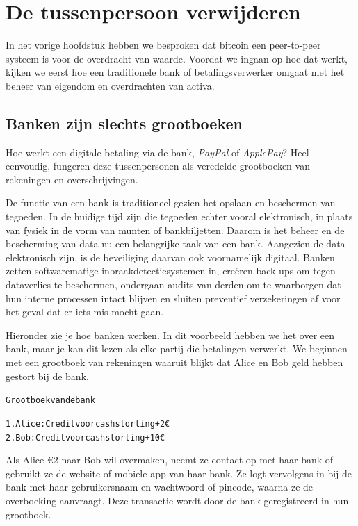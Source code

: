 \hypertarget{chap2}{%
\chapter{De tussenpersoon verwijderen}\label{chap2}}

In het vorige hoofdstuk hebben we besproken dat bitcoin een peer-to-peer systeem is voor de overdracht van waarde. Voordat we ingaan op hoe dat werkt, kijken we eerst hoe een traditionele bank of betalingsverwerker omgaat met het beheer van eigendom en overdrachten van activa.

\section{Banken zijn slechts grootboeken}

Hoe werkt een digitale betaling via de bank, \textit{PayPal} of \textit{ApplePay}? Heel eenvoudig, fungeren deze tussenpersonen als veredelde grootboeken van rekeningen en overschrijvingen.

De functie van een bank is traditioneel gezien het opslaan en beschermen van tegoeden. In de huidige tijd zijn die tegoeden echter vooral elektronisch, in plaats van fysiek in de vorm van munten of bankbiljetten. Daarom is het beheer en de bescherming van data nu een belangrijke taak van een bank. Aangezien de data elektronisch zijn, is de beveiliging daarvan ook voornamelijk digitaal. Banken zetten softwarematige inbraakdetectiesystemen in, creëren back-ups om tegen dataverlies te beschermen, ondergaan audits van derden om te waarborgen dat hun interne processen intact blijven en sluiten preventief verzekeringen af voor het geval dat er iets mis mocht gaan.

\clearpage

Hieronder zie je hoe banken werken. In dit voorbeeld hebben we het over een bank, maar je kan dit lezen als elke partij die betalingen verwerkt. We beginnen met een grootboek van rekeningen waaruit blijkt dat Alice en Bob geld hebben gestort bij de bank.

\begin{alltt}
\underline{Grootboek van de bank}

    1. Alice: Credit voor cash storting +2€
    2. Bob: Credit voor cash storting +10€
\end{alltt}

Als Alice €2 naar Bob wil overmaken, neemt ze contact op met haar bank of gebruikt ze de website of mobiele app van haar bank. Ze logt vervolgens in bij de bank met haar gebruikersnaam en wachtwoord of pincode, waarna ze de overboeking aanvraagt. Deze transactie wordt door de bank geregistreerd in hun grootboek.


